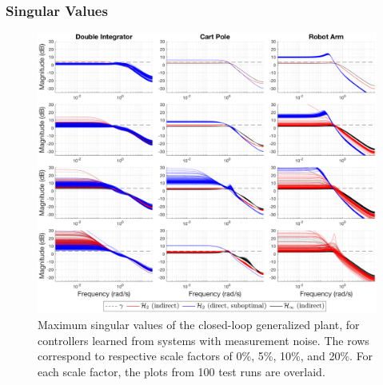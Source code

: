 \subsubsection{Singular Values}
\begin{figure}[H]
\centering
	\includegraphics[width=\textwidth]{figures/noise_singular_values4_s.png}
\caption{Maximum singular values of the closed-loop generalized plant, for controllers learned from systems with measurement noise.  The rows correspond to respective scale factors of 0\%, 5\%, 10\%, and 20\%.  For each scale factor, the plots from 100 test runs are overlaid.}
\label{fig:noise_singular_values4_s}
\end{figure}

\newpage
